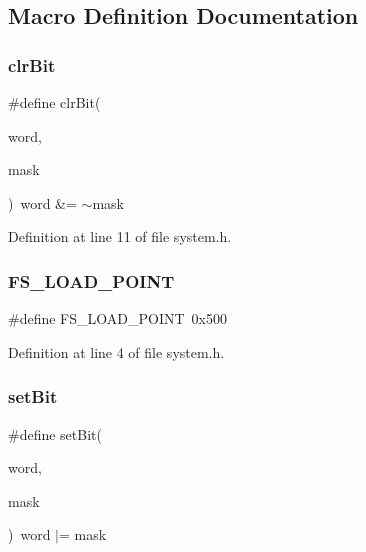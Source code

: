 \subsection{Macro Definition Documentation}
\mbox{\label{a00128_ab6ca194e33920928b4bdeff67bf0edec_ab6ca194e33920928b4bdeff67bf0edec}} 
\subsubsection{\texorpdfstring{clr\+Bit}{clrBit}}
{\footnotesize\ttfamily \#define clr\+Bit(\begin{DoxyParamCaption}\item[{}]{word,  }\item[{}]{mask }\end{DoxyParamCaption})~word \&= $\sim$mask}



Definition at line 11 of file system.\+h.

\mbox{\label{a00128_ade5f4f9306a7cacc0cb2a518bd97e237_ade5f4f9306a7cacc0cb2a518bd97e237}} 
\subsubsection{\texorpdfstring{F\+S\+\_\+\+L\+O\+A\+D\+\_\+\+P\+O\+I\+NT}{FS\_LOAD\_POINT}}
{\footnotesize\ttfamily \#define F\+S\+\_\+\+L\+O\+A\+D\+\_\+\+P\+O\+I\+NT~0x500}



Definition at line 4 of file system.\+h.

\mbox{\label{a00128_a3c47e49052cc52d10755358512c10135_a3c47e49052cc52d10755358512c10135}} 
\subsubsection{\texorpdfstring{set\+Bit}{setBit}}
{\footnotesize\ttfamily \#define set\+Bit(\begin{DoxyParamCaption}\item[{}]{word,  }\item[{}]{mask }\end{DoxyParamCaption})~word $\vert$= mask}



